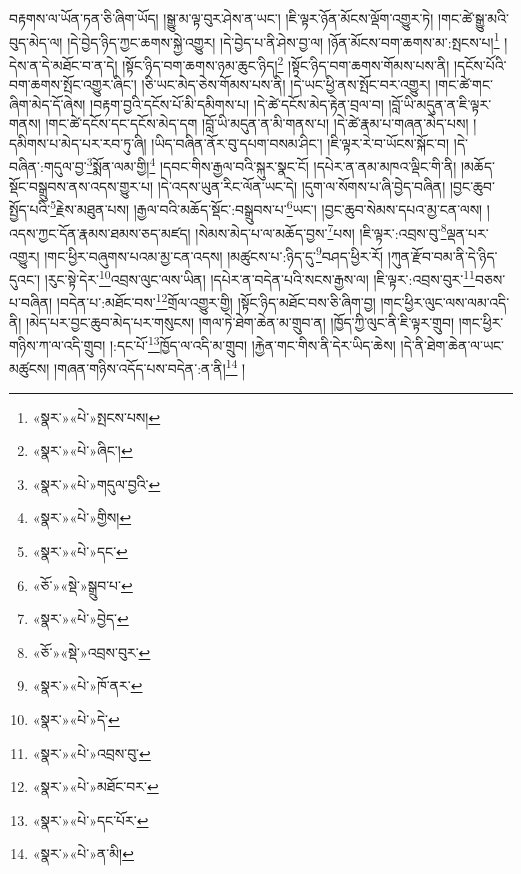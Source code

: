 བརྟགས་ལ་ཡོན་ཏན་ཅི་ཞིག་ཡོད། །སྒྱུ་མ་ལྟ་བུར་ཤེས་ན་ཡང་། །ཇི་ལྟར་ཉོན་མོངས་ལྡོག་འགྱུར་ཏེ། །གང་ཚེ་སྒྱུ་མའི་བུད་མེད་ལ། །དེ་བྱེད་ཉིད་ཀྱང་ཆགས་སྐྱེ་འགྱུར། །དེ་བྱེད་པ་ནི་ཤེས་བྱ་ལ། །ཉོན་མོངས་བག་ཆགས་མ་:སྤངས་པ།\footnote{«སྣར་»«པེ་»སྤངས་པས།} །དེས་ན་དེ་མཐོང་བ་ན་དེ། །སྟོང་ཉིད་བག་ཆགས་ཉམ་ཆུང་ཉིད།\footnote{«སྣར་»«པེ་»ཞིང་།} །སྟོང་ཉིད་བག་ཆགས་གོམས་པས་ནི། །དངོས་པོའི་བག་ཆགས་སྤོང་འགྱུར་ཞིང་། །ཅི་ཡང་མེད་ཅེས་གོམས་པས་ནི། །དེ་ཡང་ཕྱི་ནས་སྤོང་བར་འགྱུར། །གང་ཚེ་གང་ཞིག་མེད་དོ་ཞེས། །བརྟག་བྱའི་དངོས་པོ་མི་དམིགས་པ། །དེ་ཚེ་དངོས་མེད་རྟེན་བྲལ་བ། །བློ་ཡི་མདུན་ན་ཇི་ལྟར་གནས། །གང་ཚེ་དངོས་དང་དངོས་མེད་དག །བློ་ཡི་མདུན་ན་མི་གནས་པ། །དེ་ཚེ་རྣམ་པ་གཞན་མེད་པས། །དམིགས་པ་མེད་པར་རབ་ཏུ་ཞི། །ཡིད་བཞིན་ནོར་བུ་དཔག་བསམ་ཤིང་། །ཇི་ལྟར་རེ་བ་ཡོངས་སྐོང་བ། །དེ་བཞིན་:གདུལ་བྱ་\footnote{«སྣར་»«པེ་»གདུལ་བྱའི་}སྨོན་ལམ་གྱི།\footnote{«སྣར་»«པེ་»གྱིས།} །དབང་གིས་རྒྱལ་བའི་སྐུར་སྣང་ངོ། །དཔེར་ན་ནམ་མཁའ་ལྡིང་གི་ནི། །མཆོད་སྡོང་བསྒྲུབས་ནས་འདས་གྱུར་པ། །དེ་འདས་ཡུན་རིང་ལོན་ཡང་དེ། །དུག་ལ་སོགས་པ་ཞི་བྱེད་བཞིན། །བྱང་ཆུབ་སྤྱོད་པའི་\footnote{«སྣར་»«པེ་»དང་}རྗེས་མཐུན་པས། །རྒྱལ་བའི་མཆོད་སྡོང་:བསྒྲུབས་པ་\footnote{«ཅོ་»«སྡེ་»སྒྲུབ་པ་}ཡང་། །བྱང་ཆུབ་སེམས་དཔའ་མྱ་ངན་ལས། །འདས་ཀྱང་དོན་རྣམས་ཐམས་ཅད་མཛད། །སེམས་མེད་པ་ལ་མཆོད་བྱས་\footnote{«སྣར་»«པེ་»བྱེད་}པས། །ཇི་ལྟར་:འབྲས་བུ་\footnote{«ཅོ་»«སྡེ་»འབྲས་བུར་}ལྡན་པར་འགྱུར། །གང་ཕྱིར་བཞུགས་པའམ་མྱ་ངན་འདས། །མཚུངས་པ་:ཉིད་དུ་\footnote{«སྣར་»«པེ་»ཁོ་ནར་}བཤད་ཕྱིར་རོ། །ཀུན་རྫོབ་བམ་ནི་དེ་ཉིད་དུའང་། །རུང་སྟེ་དེར་\footnote{«སྣར་»«པེ་»དེ་}འབྲས་ལུང་ལས་ཡིན། །དཔེར་ན་བདེན་པའི་སངས་རྒྱས་ལ། །ཇི་ལྟར་:འབྲས་བུར་\footnote{«སྣར་»«པེ་»འབྲས་བུ་}བཅས་པ་བཞིན། །བདེན་པ་:མཐོང་བས་\footnote{«སྣར་»«པེ་»མཐོང་བར་}གྲོལ་འགྱུར་གྱི། །སྟོང་ཉིད་མཐོང་བས་ཅི་ཞིག་བྱ། །གང་ཕྱིར་ལུང་ལས་ལམ་འདི་ནི། །མེད་པར་བྱང་ཆུབ་མེད་པར་གསུངས། །གལ་ཏེ་ཐེག་ཆེན་མ་གྲུབ་ན། །ཁྱོད་ཀྱི་ལུང་ནི་ཇི་ལྟར་གྲུབ། །གང་ཕྱིར་གཉིས་ཀ་ལ་འདི་གྲུབ། །:དང་པོ་\footnote{«སྣར་»«པེ་»དང་པོར་}ཁྱོད་ལ་འདི་མ་གྲུབ། །རྐྱེན་གང་གིས་ནི་དེར་ཡིད་ཆེས། །དེ་ནི་ཐེག་ཆེན་ལ་ཡང་མཚུངས། །གཞན་གཉིས་འདོད་པས་བདེན་:ན་ནི།\footnote{«སྣར་»«པེ་»ན་མི།} །
